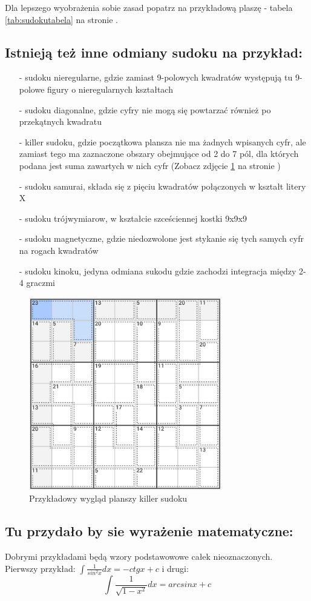 Dla lepszego wyobrażenia sobie zasad popatrz na przykładową plaszę - tabela \ref{tab:sudokutabela} na stronie \pageref{tab:sudokutabela}.



\subsection{Istnieją też inne odmiany sudoku na przykład:}
    \begin{itemize}
        \item[-]sudoku nieregularne, gdzie zamiast 9-polowych kwadratów występują tu 9-polowe figury o nieregularnych kształtach
        \item[-]sudoku diagonalne, gdzie cyfry nie mogą się powtarzać również po przekątnych kwadratu
        \item[-]killer sudoku, gdzie początkowa plansza nie ma żadnych wpisanych cyfr, ale zamiast tego ma zaznaczone obszary obejmujące od 2 do 7 pól, dla których podana jest suma zawartych w nich cyfr (Zobacz zdjęcie \ref{fig:sudokuprzyklad} na stronie \pageref{fig:sudokuprzyklad})
        \item[-]sudoku samurai, składa się z pięciu kwadratów połączonych w kształt litery X 
        \item[-]sudoku trójwymiarow, w kształcie szceściennej kostki 9x9x9 
        \item[-]sudoku magnetyczne, gdzie niedozwolone jest stykanie się tych samych cyfr na rogach kwadratów
        \item[-]sudoku kinoku, jedyna odmiana sukodu gdzie zachodzi integracja między 2-4 graczmi
    \end{itemize}

\begin{figure}[htbp]
    \centering
    \includegraphics[width=0.75\textwidth]{pictures/sudokuprzyklad.jpg}
    \caption{Przykładowy wygląd planszy killer sudoku}
    \label{fig:sudokuprzyklad}
\end{figure} 

\subsection{Tu przydało by sie wyrażenie matematyczne:}
Dobrymi przykładami będą wzory podstawowowe całek nieoznaczonych. \\Pierwszy przykład: \( \int \frac{1}{sin^2 x}dx = -ctg x +c \) i drugi: 
\begin{equation}
    \int \frac{1}{\sqrt{1-x^2}}dx = arcsin x+c
\end{equation}

